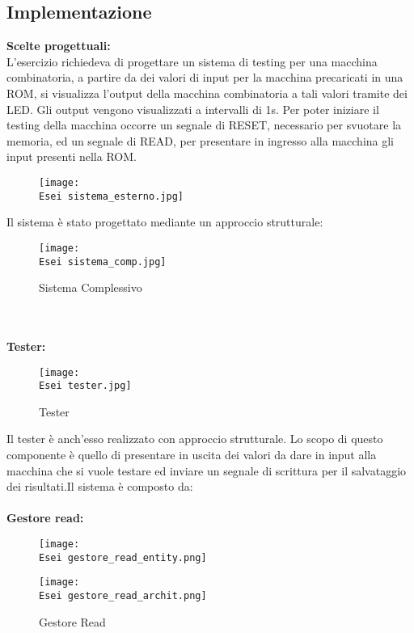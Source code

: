 \documentclass[12pt]{article}
\def \Esei {Allegati/Esercizio6/}
\begin{document}
\subsection{Implementazione}
{\large \textbf{Scelte progettuali:}}
\\L’esercizio richiedeva di progettare un sistema di testing per una macchina combinatoria, a partire da dei valori di input per la macchina precaricati in una ROM, si visualizza l’output della macchina combinatoria a tali valori tramite dei LED. Gli output vengono visualizzati a intervalli di 1s. Per poter iniziare il testing della macchina occorre un segnale di RESET, necessario per svuotare la memoria, ed un segnale di READ, per presentare in ingresso alla macchina gli input presenti nella ROM.
\begin{figure}[ht!]
    \centering
    \texttt{[image: \\Esei sistema\_esterno.jpg]}
\end{figure}
\clearpage
Il sistema è stato progettato mediante un approccio strutturale:
\begin{figure}[ht!]
    \centering
    \texttt{[image: \\Esei sistema\_comp.jpg]}
    \caption{Sistema Complessivo}
\end{figure}
\\\\{\large \textbf{Tester:}}
\begin{figure}[ht!]
    \centering
    \texttt{[image: \\Esei tester.jpg]}
    \caption{Tester}
\end{figure}
\clearpage
Il tester è anch’esso realizzato con approccio strutturale. Lo scopo di questo componente è quello di presentare in uscita dei valori da dare in input alla macchina che si vuole testare ed inviare un segnale di scrittura per il salvataggio dei risultati.Il sistema è composto da:
\\\\{\large \textbf{Gestore read:}}
\begin{figure}[ht!]
    \centering
    \texttt{[image: \\Esei gestore\_read\_entity.png]}
\end{figure}
\begin{figure}[ht!]
    \centering
    \texttt{[image: \\Esei gestore\_read\_archit.png]}
    \caption{Gestore Read}
\end{figure}
\end{document}
